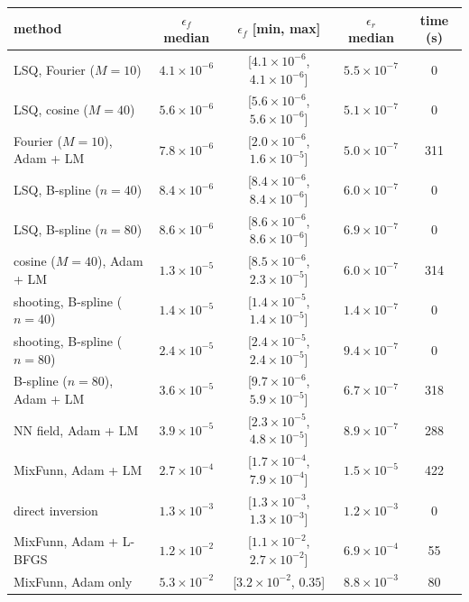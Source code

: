 \begin{tabular}{lcccc}
\toprule
method & $\epsilon_f$ median & $\epsilon_f$ [min, max] & $\epsilon_r$ median & time (s) \\
\midrule
LSQ, Fourier ($M{=}10$) & $4.1\times10^{-6}$ & [$4.1\times10^{-6}$, $4.1\times10^{-6}$] & $5.5\times10^{-7}$ & 0 \\
LSQ, cosine ($M{=}40$) & $5.6\times10^{-6}$ & [$5.6\times10^{-6}$, $5.6\times10^{-6}$] & $5.1\times10^{-7}$ & 0 \\
Fourier ($M{=}10$), Adam + LM & $7.8\times10^{-6}$ & [$2.0\times10^{-6}$, $1.6\times10^{-5}$] & $5.0\times10^{-7}$ & 311 \\
LSQ, B-spline ($n{=}40$) & $8.4\times10^{-6}$ & [$8.4\times10^{-6}$, $8.4\times10^{-6}$] & $6.0\times10^{-7}$ & 0 \\
LSQ, B-spline ($n{=}80$) & $8.6\times10^{-6}$ & [$8.6\times10^{-6}$, $8.6\times10^{-6}$] & $6.9\times10^{-7}$ & 0 \\
cosine ($M{=}40$), Adam + LM & $1.3\times10^{-5}$ & [$8.5\times10^{-6}$, $2.3\times10^{-5}$] & $6.0\times10^{-7}$ & 314 \\
shooting, B-spline ($n{=}40$) & $1.4\times10^{-5}$ & [$1.4\times10^{-5}$, $1.4\times10^{-5}$] & $1.4\times10^{-7}$ & 0 \\
shooting, B-spline ($n{=}80$) & $2.4\times10^{-5}$ & [$2.4\times10^{-5}$, $2.4\times10^{-5}$] & $9.4\times10^{-7}$ & 0 \\
B-spline ($n{=}80$), Adam + LM & $3.6\times10^{-5}$ & [$9.7\times10^{-6}$, $5.9\times10^{-5}$] & $6.7\times10^{-7}$ & 318 \\
NN field, Adam + LM & $3.9\times10^{-5}$ & [$2.3\times10^{-5}$, $4.8\times10^{-5}$] & $8.9\times10^{-7}$ & 288 \\
MixFunn, Adam + LM & $2.7\times10^{-4}$ & [$1.7\times10^{-4}$, $7.9\times10^{-4}$] & $1.5\times10^{-5}$ & 422 \\
direct inversion & $1.3\times10^{-3}$ & [$1.3\times10^{-3}$, $1.3\times10^{-3}$] & $1.2\times10^{-3}$ & 0 \\
MixFunn, Adam + L-BFGS & $1.2\times10^{-2}$ & [$1.1\times10^{-2}$, $2.7\times10^{-2}$] & $6.9\times10^{-4}$ & 55 \\
MixFunn, Adam only & $5.3\times10^{-2}$ & [$3.2\times10^{-2}$, $0.35$] & $8.8\times10^{-3}$ & 80 \\
\bottomrule
\end{tabular}

